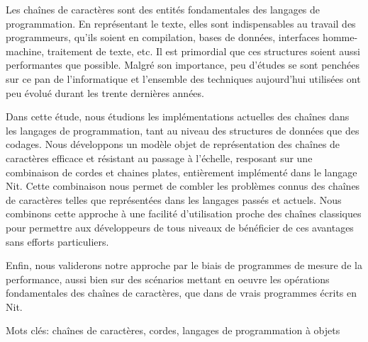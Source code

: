 {\abstract




Les chaînes de caractères sont des entités fondamentales des langages de programmation.
En représentant le texte, elles sont indispensables au travail des programmeurs, qu'ils soient en compilation, bases de données, interfaces homme-machine, traitement de texte, etc.
Il est primordial que ces structures soient aussi performantes que possible.
Malgré son importance, peu d'études se sont penchées sur ce pan de l'informatique et l'ensemble des techniques aujourd'hui utilisées ont peu évolué durant les trente dernières années.

Dans cette étude, nous étudions les implémentations actuelles des chaînes dans les langages de programmation,
tant au niveau des structures de données que des codages.
Nous développons un modèle objet de représentation des chaînes de caractères efficace et résistant au passage à l'échelle, resposant sur une combinaison de cordes et chaines plates, entièrement implémenté dans le langage Nit.
Cette combinaison nous permet de combler les problèmes connus des chaînes de caractères telles que représentées dans les langages passés et actuels.
Nous combinons cette approche à une facilité d'utilisation proche des chaînes classiques pour permettre aux développeurs de tous niveaux de bénéficier de ces avantages sans efforts particuliers.

Enfin, nous validerons notre approche par le biais de programmes de mesure de la performance, aussi bien sur des scénarios mettant en oeuvre les opérations fondamentales des chaînes de caractères, que dans de vrais programmes écrits en Nit.

Mots clés: chaînes de caractères, cordes, langages de programmation à objets
}
